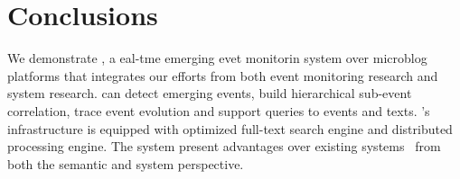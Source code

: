 
\section{Conclusions}
We demonstrate \ring, a eal-tme emerging evet monitorin system over microblog platforms
that integrates our efforts from both event monitoring research and system research.
\ring can detect emerging events, build hierarchical sub-event correlation, trace event evolution and support queries to events and texts.
\ring's infrastructure is equipped with optimized full-text search engine and distributed processing engine.
The system present advantages over existing systems~\cite{xie2014clear, schubert2014signitrend, mathioudakis2010twittermonitor} from both the semantic and system perspective.








\balance
